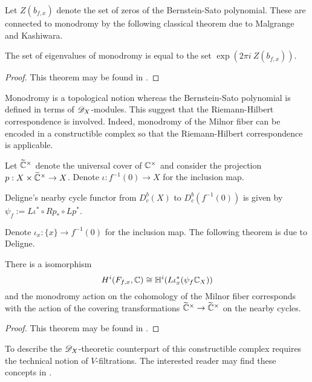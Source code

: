 Let $Z(b_{f,x})$ denote the set of zeros of the Bernstein-Sato polynomial.
These are connected to monodromy by the following classical theorem due to Malgrange and Kashiwara.
\begin{theorem}\label{thm: EigMonodromy}
The set of eigenvalues of monodromy is equal to the set $\exp(2\pi i\ Z(b_{f,x}))$.
\end{theorem}
\begin{proof}
  This theorem may be found in \cite{budur2015bernstein}.
\end{proof}
Monodromy is a topological notion whereas the Bernstein-Sato polynomial is defined in terms of $\mathscr{D}_X$-modules.
This suggest that the Riemann-Hilbert correspondence is involved.
Indeed, monodromy of the Milnor fiber can be encoded in a constructible complex so that the Riemann-Hilbert correspondence is applicable.

Let $\widetilde{\mathbb{C}}^\times$ denote the universal cover of $\mathbb{C}^\times$ and consider the projection $p:X\times \widetilde{\mathbb{C}}^\times \to X$.
Denote $\iota:f^{-1}(0)\to X$ for the inclusion map.
\begin{definition}
  Deligne's nearby cycle functor from $D^b_c(X)$ to $D_c^b(f^{-1}(0))$ is given by $\psi_f:= L\iota^* \circ Rp_*\circ Lp^*$.
\end{definition}
Denote $\iota_x:\{x\}\to f^{-1}(0)$ for the inclusion map.
The following theorem is due to Deligne.
\begin{theorem}
  There is a isomorphism
  $$H^i(F_{f,x}, \mathbb{C}) \cong \mathbb{H}^i(L\iota_x^* (\psi_f \mathbb{C}_X)) $$
  and the monodromy action on the cohomology of the Milnor fiber corresponds with the action of the covering transformations $\widetilde{\mathbb{C}}^\times \to \widetilde{\mathbb{C}}^\times$ on the nearby cycles.
\end{theorem}
\begin{proof}
  This theorem may be found in \cite{budur2015bernstein}.
\end{proof}
To describe the $\mathscr{D}_X$-theoretic counterpart of this constructible complex requires the technical notion of $V$-filtrations.
The interested reader may find these concepts in \cite{budur2015bernstein}.
